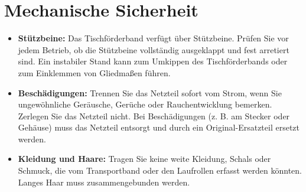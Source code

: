\section{Mechanische Sicherheit}
\begin{itemize}
	\item \textbf {Stützbeine:}
	Das Tischförderband verfügt über Stützbeine. Prüfen Sie vor jedem Betrieb, ob die Stützbeine vollständig ausgeklappt und fest arretiert sind. Ein instabiler Stand kann zum Umkippen des Tischförderbands oder zum Einklemmen von Gliedmaßen führen.
	\item \textbf {Beschädigungen:}
	Trennen Sie das Netzteil sofort vom Strom, wenn Sie ungewöhnliche Geräusche, Gerüche oder Rauchentwicklung bemerken. Zerlegen Sie das Netzteil nicht. Bei Beschädigungen (z. B. am Stecker oder Gehäuse) muss das Netzteil entsorgt und durch ein Original-Ersatzteil ersetzt werden.
	\item \textbf {Kleidung und Haare:}
	Tragen Sie keine weite Kleidung, Schals oder Schmuck, die vom   Transportband oder den Laufrollen erfasst werden könnten. Langes Haar muss zusammengebunden werden.
\end{itemize}
